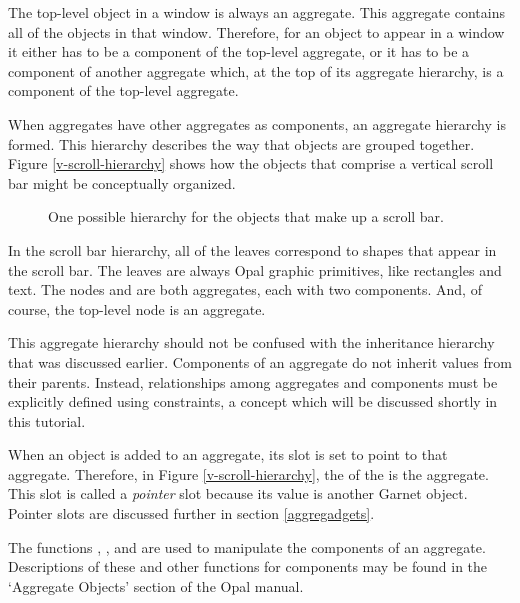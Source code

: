 The top-level object in a window is always an aggregate.  This
aggregate contains all of the objects in that window.
Therefore, for an object to appear in a window it either has to be a
component of the top-level aggregate, or it has to be a component of
another aggregate which, at the top of its aggregate hierarchy, is a
component of the top-level aggregate.

When aggregates have other aggregates as components, an aggregate hierarchy
is formed.  This hierarchy describes the way that objects are grouped together.
Figure \ref{v-scroll-hierarchy} shows how the objects that comprise a
vertical scroll bar might be conceptually organized.

\begin{figure}
\begin{center}
                 \end{center}
\caption{One possible hierarchy for the objects that make up a scroll bar.}
\end{figure}

In the scroll bar hierarchy, all of the leaves correspond to shapes
that appear in the scroll bar.  The leaves are always Opal graphic
primitives, like rectangles and text.  The nodes  and
 are both aggregates, each with two components.
And, of course, the top-level  node is an aggregate.

This aggregate hierarchy should not be confused with the inheritance
hierarchy that was discussed earlier.  Components of an aggregate do
not inherit values from their parents.  Instead, relationships among
aggregates and components must be explicitly defined using
constraints, a concept which will be discussed shortly in this tutorial.

When an object is added to an aggregate, its  slot is set
to point to that aggregate.  Therefore, in Figure \ref{v-scroll-hierarchy},
the  of the  is the 
aggregate.  This  slot is called a {\it pointer} slot because
its value is another Garnet object.  Pointer slots are discussed
further in section \ref{aggregadgets}.

The functions , ,
and  are used to manipulate the components of an
aggregate.  Descriptions of these and other functions for components
may be found in the `Aggregate Objects' section of the Opal manual.


